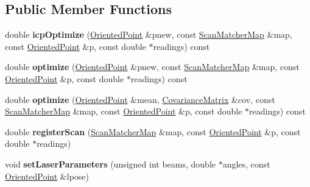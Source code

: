 \subsection*{Public Member Functions}
\begin{DoxyCompactItemize}
\item 
\mbox{\label{classGMapping_1_1ScanMatcher_a219a9d84a3f13241cd06f89ebf128f77}} 
double {\bfseries icp\+Optimize} (\hyperlink{structGMapping_1_1orientedpoint}{Oriented\+Point} \&pnew, const \hyperlink{classGMapping_1_1Map}{Scan\+Matcher\+Map} \&map, const \hyperlink{structGMapping_1_1orientedpoint}{Oriented\+Point} \&p, const double $\ast$readings) const
\item 
\mbox{\label{classGMapping_1_1ScanMatcher_a1484d288d25465f68c7107b9700d0295}} 
double {\bfseries optimize} (\hyperlink{structGMapping_1_1orientedpoint}{Oriented\+Point} \&pnew, const \hyperlink{classGMapping_1_1Map}{Scan\+Matcher\+Map} \&map, const \hyperlink{structGMapping_1_1orientedpoint}{Oriented\+Point} \&p, const double $\ast$readings) const
\item 
\mbox{\label{classGMapping_1_1ScanMatcher_a2002a79c40c66916ec4c66b72420c68e}} 
double {\bfseries optimize} (\hyperlink{structGMapping_1_1orientedpoint}{Oriented\+Point} \&mean, \hyperlink{structGMapping_1_1Covariance3}{Covariance\+Matrix} \&cov, const \hyperlink{classGMapping_1_1Map}{Scan\+Matcher\+Map} \&map, const \hyperlink{structGMapping_1_1orientedpoint}{Oriented\+Point} \&p, const double $\ast$readings) const
\item 
\mbox{\label{classGMapping_1_1ScanMatcher_a0f3580f546f42463df8eb27bae244658}} 
double {\bfseries register\+Scan} (\hyperlink{classGMapping_1_1Map}{Scan\+Matcher\+Map} \&map, const \hyperlink{structGMapping_1_1orientedpoint}{Oriented\+Point} \&p, const double $\ast$readings)
\item 
\mbox{\label{classGMapping_1_1ScanMatcher_a64191c56d4fd0dedea13acf4228fb3d7}} 
void {\bfseries set\+Laser\+Parameters} (unsigned int beams, double $\ast$angles, const \hyperlink{structGMapping_1_1orientedpoint}{Oriented\+Point} \&lpose)
\item 
\mbox{\label{classGMapping_1_1ScanMatcher_aad081e39e5629e1532af566370b842fb}} 

\end{DoxyCompactItemize}
